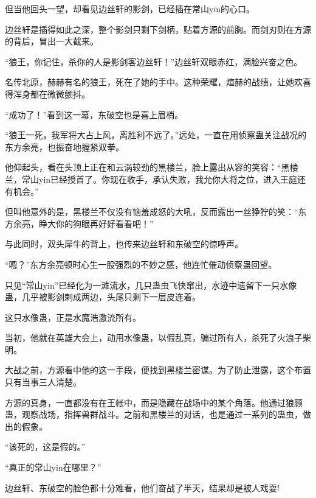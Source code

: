 \begin{this_body}
但当他回头一望，却看见边丝轩的影剑，已经插在常山yin的心口。

边丝轩是插得如此之深，整个影剑只剩下剑柄，贴着方源的前胸。而剑刃则在方源的背后，冒出一大截来。

“狼王，你记住，杀你的人是影剑客边丝轩！”边丝轩双眼赤红，满脸兴奋之色。

名传北原，赫赫有名的狼王，死在了她的手中。这种荣耀，煊赫的战绩，让她欢喜得浑身都在微微颤抖。

“成功了！”看到这一幕，东破空也是喜上眉梢。

“狼王一死，我军将大占上风，离胜利不远了。”远处，一直在用侦察蛊关注战况的东方余亮，也振奋地握紧双拳。

他仰起头，看在头顶上正在和云涡较劲的黑楼兰，脸上露出从容的笑容：“黑楼兰，常山yin已经授首了。你现在收手，承认失败，我允你大将之位，进入王庭还有机会。”

但叫他意外的是，黑楼兰不仅没有恼羞成怒的大吼，反而露出一丝狰狞的笑：“东方余亮，睁大你的狗眼再好好看看吧！”

与此同时，双头犀牛的背上，也传来边丝轩和东破空的惊呼声。

“嗯？”东方余亮顿时心生一股强烈的不妙之感，他连忙催动侦察蛊回望。

只见“常山yin”已经化为一滩流水，几只蛊虫飞快窜出，水迹中遗留下一只水像蛊，几乎被影剑刺成两边，头尾只剩下一层皮连着。

这只水像蛊，正是水魔浩激流所有。

当初，他就在英雄大会上，动用水像蛊，以假乱真，骗过所有人，杀死了火浪子柴明。

大战之前，方源看中他的这一手段，便找到黑楼兰密谋。为了防止泄露，这个布置只有当事三人清楚。

方源的真身，一直都没有在王帐中，而是隐藏在战场中的某个角落。他通过狼顾蛊，观察战场，指挥兽群战斗。之前和黑楼兰的对话，也是通过一系列的蛊虫，做出的假象。

“该死的，这是假的。”

“真正的常山yin在哪里？”

边丝轩、东破空的脸色都十分难看，他们奋战了半天，结果却是被人戏耍!

\end{this_body}

